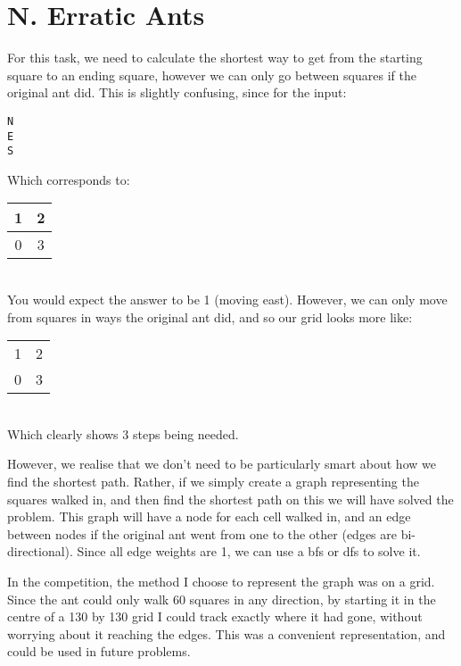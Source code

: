\section*{N. Erratic Ants}

For this task, we need to calculate the shortest way to get from the starting square to an ending square, however we can only go between squares if the original ant did. This is slightly confusing, since for the input:
\begin{verbatim}
N
E
S
\end{verbatim}
Which corresponds to:
\\
\begin{tabular}{ | c | c | }
\hline
1 & 2 \\ \hline
0 & 3 \\ \hline
\end{tabular}
\\
You would expect the answer to be 1 (moving east). However, we can only move from squares in ways the original ant did, and so our grid looks more like:
\\
\begin{tabular}{ | c | c | }
\hline
\multicolumn{1}{|c}{1} & 2 \\
0 & 3 \\ \hline
\end{tabular}
\\
Which clearly shows 3 steps being needed.

However, we realise that we don't need to be particularly smart about how we find the shortest path. Rather, if we simply create a graph representing the squares walked in, and then find the shortest path on this we will have solved the problem. This graph will have a node for each cell walked in, and an edge between nodes if the original ant went from one to the other (edges are bi-directional). Since all edge weights are 1, we can use a bfs or dfs to solve it.

In the competition, the method I choose to represent the graph was on a grid. Since the ant could only walk 60 squares in any direction, by starting it in the centre of a 130 by 130 grid I could track exactly where it had gone, without worrying about it reaching the edges. This was a convenient representation, and could be used in future problems.